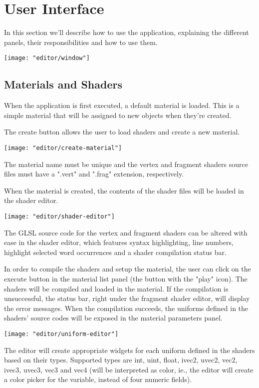 \section{User Interface}
In this section we'll describe how to use the application, explaining the different panels, their responsibilities and how to use them.

\texttt{[image: "editor/window"]}

\subsection{Materials and Shaders}
When the application is first executed, a default material is loaded. This is a simple material that will be assigned to new objects when they're created.

The create button allows the user to load shaders and create a new material.

\texttt{[image: "editor/create-material"]}

The material name must be unique and the vertex and fragment shaders source files must have a ".vert" and ".frag" extension, respectively.

When the material is created, the contents of the shader files will be loaded in the shader editor.

\texttt{[image: "editor/shader-editor"]}

The GLSL source code for the vertex and fragment shaders can be altered with ease in the shader editor, which features syntax highlighting, line numbers, highlight selected word occurrences and a shader compilation status bar.

In order to compile the shaders and setup the material, the user can click on the execute button in the material list panel (the button with the "play" icon). The shaders will be compiled and loaded in the material. If the compilation is unsuccessful, the status bar, right under the fragment shader editor, will display the error messages. When the compilation succeeds, the uniforms defined in the shaders' source codes will be exposed in the material parameters panel.

\texttt{[image: "editor/uniform-editor"]}

The editor will create appropriate widgets for each uniform defined in the shaders based on their types. Supported types are int, uint, float, ivec2, uvec2, vec2, ivec3, uvec3, vec3 and vec4 (will be interpreted as color, ie., the editor will create a color picker for the variable, instead of four numeric fields).

